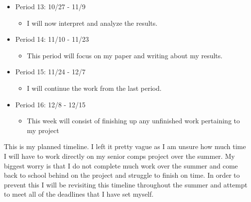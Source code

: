 \documentclass[10pt,twocolumn]{article}
\begin{document}
\begin{itemize}
\begin{itemize}
    \end{itemize}
    \item Period 13: 10/27 - 11/9
    \begin{itemize}
            \item I will now interpret and analyze the results. 
    \end{itemize}
    \item Period 14: 11/10 - 11/23
    \begin{itemize}
            \item This period will focus on my paper and writing about my results. 
    \end{itemize}
    \item Period 15: 11/24 - 12/7
    \begin{itemize}
            \item I will continue the work from the last period.  
    \end{itemize}
    \item Period 16: 12/8 - 12/15
    \begin{itemize}
            \item This week will consist of finishing up any unfinished work pertaining to my project
    \end{itemize}
\end{itemize}

This is my planned timeline. I left it pretty vague as I am unsure how much time I will have to work directly on my senior comps project over the summer. My biggest worry is that I do not complete much work over the summer and come back to school behind on the project and struggle to finish on time. In order to prevent this I will be revisiting this timeline throughout the summer and attempt to meet all of the deadlines that I have set myself. 



\printbibliography
\end{document}
